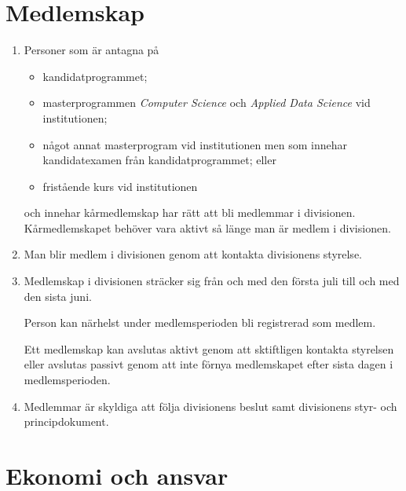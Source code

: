 \documentclass{dvd}
\begin{document}
	\section{Medlemskap}

	\begin{enumerate}[label=\arabic* §, ref=\arabic*]

		\item Personer som är antagna på

		\begin{itemize}
			\item kandidatprogrammet;

			\item masterprogrammen \emph{Computer Science} och \emph{Applied Data Science} vid institutionen;

			\item något annat masterprogram vid institutionen men som innehar kandidatexamen från kandidatprogrammet; eller

			\item fristående kurs vid institutionen
		\end{itemize}

		och innehar kårmedlemskap har rätt att bli medlemmar i divisionen.
		Kårmedlemskapet behöver vara aktivt så länge man är medlem i divisionen.

		\item Man blir medlem i divisionen genom att kontakta divisionens styrelse.

		\item Medlemskap i divisionen sträcker sig från och med den första juli till och med den sista juni.

		Person kan närhelst under medlemsperioden bli registrerad som medlem.

		Ett medlemskap kan avslutas aktivt genom att sktiftligen kontakta styrelsen eller avslutas passivt genom att inte förnya medlemskapet efter sista dagen i medlemsperioden.

		\item Medlemmar är skyldiga att följa divisionens beslut samt divisionens styr- och principdokument.
	\end{enumerate}

	\section{Ekonomi och ansvar}
\end{document}
